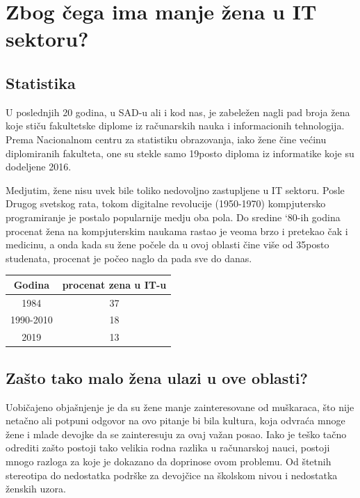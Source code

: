 \documentclass[a4paper,12pt]{article}
\begin{document}
\section{Zbog čega ima manje žena u IT sektoru?}

\subsection{Statistika}

U poslednjih 20 godina, u SAD-u ali i kod nas, je zabeležen nagli pad broja žena koje stiču fakultetske diplome iz računarskih nauka i
informacionih tehnologija. Prema Nacionalnom centru za statistiku obrazovanja, iako žene čine većinu diplomiranih fakulteta, 
one su stekle samo 19posto diploma iz informatike koje su dodeljene 2016.

Medjutim, žene nisu uvek bile toliko nedovoljno zastupljene u IT sektoru. Posle Drugog svetskog rata, 
tokom digitalne revolucije (1950-1970) kompjutersko programiranje je postalo popularnije medju oba pola. 
Do sredine `80-ih godina procenat žena na kompjuterskim naukama rastao je veoma brzo i pretekao čak i medicinu, 
a onda kada su žene počele da u ovoj oblasti čine više od 35posto studenata, procenat je počeo naglo da pada sve do danas. 

\begin{table}[h]
\centering
\begin{tabular}{c|c}
\toprule
Godina    & procenat zena u IT-u \\ 
\midrule
1984      & 37                   \\ 
1990-2010 & 18                   \\ 
2019      & 13                   \\ 
\bottomrule
\end{tabular}
\end{table}



\subsection{Zašto tako malo žena ulazi u ove oblasti? }
Uobičajeno objašnjenje je da su žene manje zainteresovane od muškaraca, 
što nije netačno ali potpuni odgovor na ovo pitanje bi bila kultura, 
koja odvraća mnoge žene i mlade devojke da se zainteresuju za ovaj važan posao.
Iako je teško tačno odrediti zašto postoji tako velikia rodna razlika u računarskoj nauci, 
postoji mnogo razloga za koje je dokazano da doprinose ovom problemu. 
Od štetnih stereotipa do nedostatka podrške za devojčice na školskom nivou i nedostatka ženskih uzora.
\end{document}
